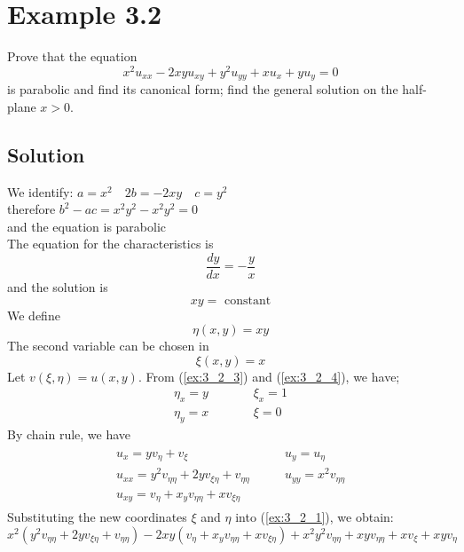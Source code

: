 \documentclass[11pt]{report}
\newcommand{\sps}{\\[0.2cm]}
\begin{document}
	
	\section*{Example 3.2}
	Prove that the equation
	\begin{equation}
		x^2u_{xx} - 2xyu_{xy} + y^2u_{yy} + xu_{x} + yu_y=0 \tag{1}\label{ex:3_2_1}
	\end{equation}
	is parabolic and find its canonical form; find the general solution on the half-plane $x>0$.\\
	\subsection*{Solution}
	We identify: $a=x^2\quad 2b=-2xy\quad c=y^2$\\
	therefore $b^2-ac=x^2y^2-x^2y^2=0$\\
	and the equation is parabolic\sps
	The equation for the characteristics is
	\begin{equation}
		\frac{dy}{dx} = -\frac{y}{x} \label{ex:3_2_2} \tag{2}
	\end{equation}
	and the solution is
	\begin{equation*}
		xy = \text{ constant}
	\end{equation*}
	We define
	\begin{equation}
		\eta(x,y)=xy \label{ex:3_2_3}\tag{3}
	\end{equation}
	The second variable can be chosen in
	\begin{equation}
		\xi(x,y)=x\label{ex:3_2_4}\tag{4}
	\end{equation}
	Let $v(\xi,\eta) = u(x,y)$. From (\ref{ex:3_2_3}) and (\ref{ex:3_2_4}), we have;
	\begin{eqnarray*}
		\eta_x =y &\qquad&\xi_x = 1\\
		\eta_y = x &\qquad&\xi = 0
	\end{eqnarray*}
	By chain rule, we have
	\begin{eqnarray*}
		\begin{array}{ll}
			u_x = yv_\eta + v_\xi &\qquad u_y = u_\eta\\
			u_{xx} = y^2v_{\eta\eta} + 2yv_{\xi\eta}+v_{\eta\eta} &\qquad u_{yy} = x^2v_{\eta\eta}\\
			u_{xy}=v_\eta + x_yv_{\eta\eta} + xv_{\xi\eta}
		\end{array}
	\end{eqnarray*}
	Substituting the new coordinates $\xi$ and $\eta$ into (\ref{ex:3_2_1}), we obtain:
	\begin{equation}
		x^2(y^2v_{\eta\eta} + 2yv_{\xi\eta}+v_{\eta\eta})-2xy(v_\eta + x_yv_{\eta\eta} + xv_{\xi\eta}) + x^2y^2v_{\eta\eta} + xyv_{\eta\eta} + xv_{\xi}+xyv_\eta\label{ex:3_2_5}\tag{5}
	\end{equation}
\end{document}
